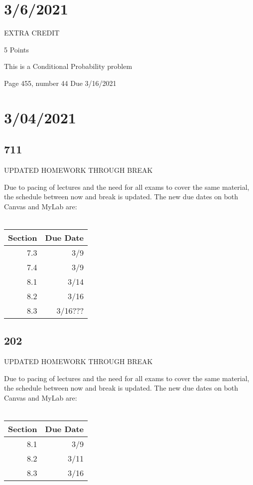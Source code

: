 \documentclass[]{article}
\begin{document}
\section*{3/6/2021}
EXTRA CREDIT

5 Points

This is a Conditional Probability problem

Page 455, number 44
Due 3/16/2021
	
\section*{3/04/2021}
\subsection*{711}
UPDATED HOMEWORK THROUGH BREAK

Due to pacing of lectures and the need for all exams to cover the same material, the schedule between now and break is updated. The new due dates on both Canvas and MyLab are:\\\\
\bgroup
\def\arraystretch{1.5}
\begin{tabular}{|r|r|}
	\hline
	Section & Due Date \\
	\hline
	7.3 & 3/9 \\
	\hline
	7.4 & 3/9 \\
	\hline
	8.1 & 3/14 \\
	\hline
	8.2 & 3/16 \\
	\hline
	8.3 & 3/16??? \\
	\hline
\end{tabular}
\egroup

\subsection*{202}
UPDATED HOMEWORK THROUGH BREAK

Due to pacing of lectures and the need for all exams to cover the same material, the schedule between now and break is updated. The new due dates on both Canvas and MyLab are:\\\\
\bgroup
\def\arraystretch{1.5}
\begin{tabular}{|r|r|}
	\hline
	Section & Due Date \\
	\hline
	8.1 & 3/9 \\
	\hline
	8.2 & 3/11 \\
	\hline
	8.3 & 3/16 \\
	\hline
\end{tabular}
\egroup
\end{document}
